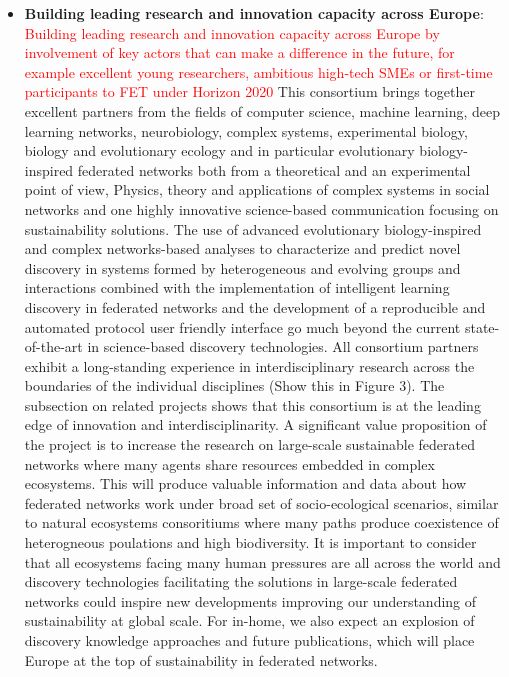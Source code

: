 \documentclass[11pt, a4paper]{article} %
\begin{document}
{\begin{itemize}
\item {\bf Building leading research and innovation capacity across Europe}:\\
  \textcolor{red}{Building leading research and innovation capacity
    across Europe by involvement of key actors that can make a
    difference in the future, for example excellent young researchers,
    ambitious high-tech SMEs or first-time participants to FET under
    Horizon 2020} This consortium brings together excellent partners
  from the fields of computer science, machine learning, deep learning
  networks, neurobiology, complex systems, experimental biology,
  biology and evolutionary ecology and in particular evolutionary
  biology-inspired federated networks both from a theoretical and an
  experimental point of view, Physics, theory and applications of
  complex systems in social networks and one highly innovative
  science-based communication focusing on sustainability
  solutions. The use of advanced evolutionary biology-inspired and
  complex networks-based analyses to characterize and predict novel
  discovery in systems formed by heterogeneous and evolving groups and
  interactions combined with the implementation of intelligent
  learning discovery in federated networks and the development of a
  reproducible and automated protocol user friendly interface go much
  beyond the current state-of-the-art in science-based discovery
  technologies. All consortium partners exhibit a long-standing
  experience in interdisciplinary research across the boundaries of
  the individual disciplines (Show this in Figure 3). The subsection
  on related projects shows that this consortium is at the leading
  edge of innovation and interdisciplinarity. A significant value
  proposition of the project is to increase the research on
  large-scale sustainable federated networks where many agents share
  resources embedded in complex ecosystems. This will produce valuable
  information and data about how federated networks work under broad
  set of socio-ecological scenarios, similar to natural ecosystems
  consoritiums where many paths produce coexistence of heterogneous
  poulations and high biodiversity. It is important to consider that
  all ecosystems facing many human pressures are all across the world
  and discovery technologies facilitating the solutions in large-scale
  federated networks could inspire new developments improving our
  understanding of sustainability at global scale. For in-home, we
  also expect an explosion of discovery knowledge approaches and
  future publications, which will place Europe at the top of
  sustainability in federated networks.


\end{itemize}}
\end{document}
